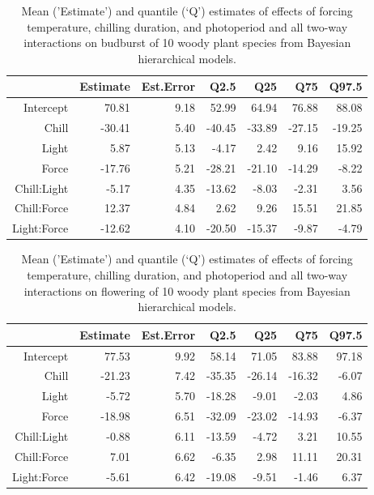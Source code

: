 \documentclass{article}\usepackage[]{graphicx}\usepackage[]{color}
\begin{document}
\begin{table}[ht]
\centering
\begin{tabular}{rrrrrrr}
  \hline
 & Estimate & Est.Error & Q2.5 & Q25 & Q75 & Q97.5 \\ 
  \hline
Intercept & 70.81 & 9.18 & 52.99 & 64.94 & 76.88 & 88.08 \\ 
  Chill & -30.41 & 5.40 & -40.45 & -33.89 & -27.15 & -19.25 \\ 
  Light & 5.87 & 5.13 & -4.17 & 2.42 & 9.16 & 15.92 \\ 
  Force & -17.76 & 5.21 & -28.21 & -21.10 & -14.29 & -8.22 \\ 
  Chill:Light & -5.17 & 4.35 & -13.62 & -8.03 & -2.31 & 3.56 \\ 
  Chill:Force & 12.37 & 4.84 & 2.62 & 9.26 & 15.51 & 21.85 \\ 
  Light:Force & -12.62 & 4.10 & -20.50 & -15.37 & -9.87 & -4.79 \\ 
   \hline
\end{tabular}
\caption{ Mean ('Estimate') and quantile (`Q') estimates of effects of forcing temperature, chilling duration, and photoperiod and all two-way interactions on budburst of 10 woody plant species from Bayesian hierarchical models.} 
\label{tab:modelests}
\end{table}
\begin{table}[ht]
\centering
\begin{tabular}{rrrrrrr}
  \hline
 & Estimate & Est.Error & Q2.5 & Q25 & Q75 & Q97.5 \\ 
  \hline
Intercept & 77.53 & 9.92 & 58.14 & 71.05 & 83.88 & 97.18 \\ 
  Chill & -21.23 & 7.42 & -35.35 & -26.14 & -16.32 & -6.07 \\ 
  Light & -5.72 & 5.70 & -18.28 & -9.01 & -2.03 & 4.86 \\ 
  Force & -18.98 & 6.51 & -32.09 & -23.02 & -14.93 & -6.37 \\ 
  Chill:Light & -0.88 & 6.11 & -13.59 & -4.72 & 3.21 & 10.55 \\ 
  Chill:Force & 7.01 & 6.62 & -6.35 & 2.98 & 11.11 & 20.31 \\ 
  Light:Force & -5.61 & 6.42 & -19.08 & -9.51 & -1.46 & 6.37 \\ 
   \hline
\end{tabular}
\caption{Mean ('Estimate') and quantile (`Q') estimates of effects of forcing temperature, chilling duration, and photoperiod and all two-way interactions on flowering of 10 woody plant species from Bayesian hierarchical models.} 
\label{tab:modelests2}
\end{table}
\end{document}
